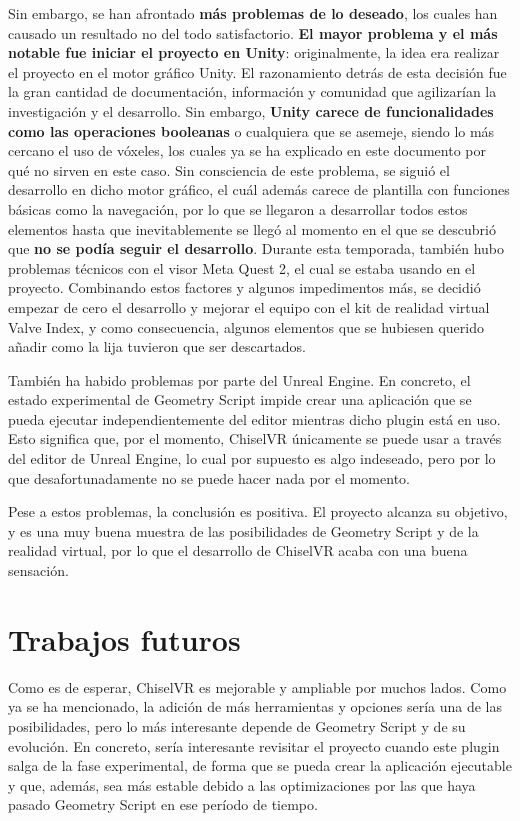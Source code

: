 Sin embargo, se han afrontado \textbf{más problemas de lo deseado}, los cuales han causado un resultado no del todo satisfactorio. \textbf{El mayor problema y el más notable fue iniciar el proyecto en Unity}: originalmente, la idea era realizar el proyecto en el motor gráfico Unity. El razonamiento detrás de esta decisión fue la gran cantidad de documentación, información y comunidad que agilizarían la investigación y el desarrollo. Sin embargo, \textbf{Unity carece de funcionalidades como las operaciones booleanas} o cualquiera que se asemeje, siendo lo más cercano el uso de vóxeles, los cuales ya se ha explicado en este documento por qué no sirven en este caso. Sin consciencia de este problema, se siguió el desarrollo en dicho motor gráfico, el cuál además carece de plantilla con funciones básicas como la navegación, por lo que se llegaron a desarrollar todos estos elementos hasta que inevitablemente se llegó al momento en el que se descubrió que \textbf{no se podía seguir el desarrollo}. Durante esta temporada, también hubo problemas técnicos con el visor Meta Quest 2, el cual se estaba usando en el proyecto. Combinando estos factores y algunos impedimentos más, se decidió empezar de cero el desarrollo y mejorar el equipo con el kit de realidad virtual Valve Index, y como consecuencia, algunos elementos que se hubiesen querido añadir como la lija tuvieron que ser descartados.

También ha habido problemas por parte del Unreal Engine. En concreto, el estado experimental de Geometry Script impide crear una aplicación que se pueda ejecutar independientemente del editor mientras dicho plugin está en uso. Esto significa que, por el momento, ChiselVR únicamente se puede usar a través del editor de Unreal Engine, lo cual por supuesto es algo indeseado, pero por lo que desafortunadamente no se puede hacer nada por el momento.

Pese a estos problemas, la conclusión es positiva. El proyecto alcanza su objetivo, y es una muy buena muestra de las posibilidades de Geometry Script y de la realidad virtual, por lo que el desarrollo de ChiselVR acaba con una buena sensación.

\section{Trabajos futuros}

Como es de esperar, ChiselVR es mejorable y ampliable por muchos lados. Como ya se ha mencionado, la adición de más herramientas y opciones sería una de las posibilidades, pero lo más interesante depende de Geometry Script y de su evolución. En concreto, sería interesante revisitar el proyecto cuando este plugin salga de la fase experimental, de forma que se pueda crear la aplicación ejecutable y que, además, sea más estable debido a las optimizaciones por las que haya pasado Geometry Script en ese período de tiempo.

